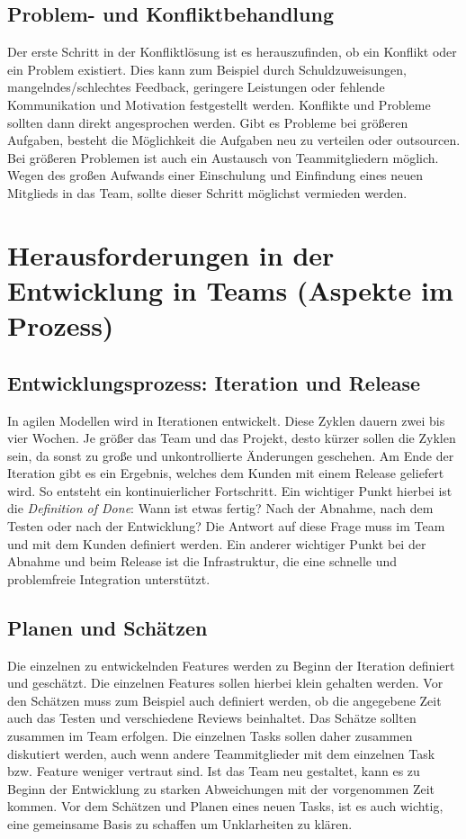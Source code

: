 \subsection{Problem- und Konfliktbehandlung}
Der erste Schritt in der Konfliktlösung ist es herauszufinden, ob ein Konflikt oder ein Problem existiert. Dies kann zum Beispiel durch Schuldzuweisungen, mangelndes/schlechtes Feedback, geringere Leistungen oder fehlende Kommunikation und Motivation festgestellt werden. Konflikte und Probleme sollten dann direkt angesprochen werden. Gibt es Probleme bei größeren Aufgaben, besteht die Möglichkeit die Aufgaben neu zu verteilen oder outsourcen. Bei größeren Problemen ist auch ein Austausch von Teammitgliedern möglich. Wegen des großen Aufwands einer Einschulung und Einfindung eines neuen Mitglieds in das Team, sollte dieser Schritt möglichst vermieden werden. 
\section{Herausforderungen in der Entwicklung in Teams (Aspekte im Prozess)}
\subsection{Entwicklungsprozess: Iteration und Release}
In agilen Modellen wird in Iterationen entwickelt. Diese Zyklen dauern zwei bis vier Wochen. Je größer das Team und das Projekt, desto kürzer sollen die Zyklen sein, da sonst zu große und unkontrollierte Änderungen geschehen. Am Ende der Iteration gibt es ein Ergebnis, welches dem Kunden mit einem Release geliefert wird. So entsteht ein kontinuierlicher Fortschritt. Ein wichtiger Punkt hierbei ist die \textit{Definition of Done}: Wann ist etwas fertig? Nach der Abnahme, nach dem Testen oder nach der Entwicklung? Die Antwort auf diese Frage muss im Team und mit dem Kunden definiert werden. Ein anderer wichtiger Punkt bei der Abnahme und beim Release ist die Infrastruktur, die eine schnelle und problemfreie Integration unterstützt. ~\parencite{ecksteinTeams}
\subsection{Planen und Schätzen}
Die einzelnen zu entwickelnden Features werden zu Beginn der Iteration definiert und geschätzt. Die einzelnen Features sollen hierbei klein gehalten werden. Vor den Schätzen muss zum Beispiel auch definiert werden, ob die angegebene Zeit auch das Testen und verschiedene Reviews beinhaltet. Das Schätze sollten zusammen im Team erfolgen. Die einzelnen Tasks sollen daher zusammen diskutiert werden, auch wenn andere Teammitglieder mit dem einzelnen Task bzw. Feature weniger vertraut sind. Ist das Team neu gestaltet, kann es zu Beginn der Entwicklung zu starken Abweichungen mit der vorgenommen Zeit kommen. Vor dem Schätzen und Planen eines neuen Tasks, ist es auch wichtig, eine gemeinsame Basis zu schaffen um Unklarheiten zu klären. 
